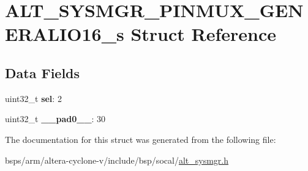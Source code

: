 \hypertarget{structALT__SYSMGR__PINMUX__GENERALIO16__s}{}\section{A\+L\+T\+\_\+\+S\+Y\+S\+M\+G\+R\+\_\+\+P\+I\+N\+M\+U\+X\+\_\+\+G\+E\+N\+E\+R\+A\+L\+I\+O16\+\_\+s Struct Reference}
\label{structALT__SYSMGR__PINMUX__GENERALIO16__s}
\subsection*{Data Fields}
\begin{DoxyCompactItemize}
\item 
\mbox{\label{structALT__SYSMGR__PINMUX__GENERALIO16__s_ae8fa91f67e531af9b559f75d9b2de76b}} 
uint32\+\_\+t {\bfseries sel}\+: 2
\item 
\mbox{\label{structALT__SYSMGR__PINMUX__GENERALIO16__s_a21cc82ebbbb979fd601897109d436acd}} 
uint32\+\_\+t {\bfseries \+\_\+\+\_\+pad0\+\_\+\+\_\+}\+: 30
\end{DoxyCompactItemize}


The documentation for this struct was generated from the following file\+:\begin{DoxyCompactItemize}
\item 
bsps/arm/altera-\/cyclone-\/v/include/bsp/socal/\mbox{\hyperlink{alt__sysmgr_8h}{alt\+\_\+sysmgr.\+h}}\end{DoxyCompactItemize}
